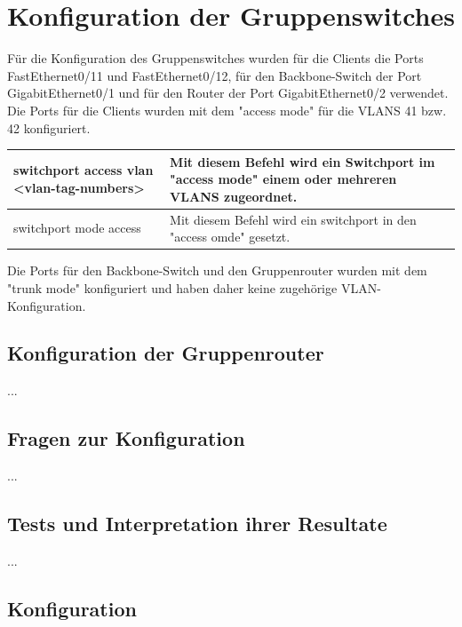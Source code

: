 \documentclass{article}
\begin{document}
\section{Konfiguration der Gruppenswitches}

Für die Konfiguration des Gruppenswitches wurden für die Clients die Ports FastEthernet0/11 und FastEthernet0/12, für den Backbone-Switch der Port GigabitEthernet0/1 und für den Router der Port GigabitEthernet0/2 verwendet.
Die Ports für die Clients wurden mit dem "access mode" für die VLANS 41 bzw. 42 konfiguriert.

\begin{tabular}{ | m{} | m{} | } 
  \hline
  switchport access vlan <vlan-tag-numbers> & Mit diesem Befehl wird ein Switchport im "access mode" einem oder mehreren VLANS zugeordnet. \\ 
  \hline
  switchport mode access & Mit diesem Befehl wird ein switchport in den "access omde" gesetzt. \\ 
  \hline
\end{tabular}
Die Ports für den Backbone-Switch und den Gruppenrouter wurden mit dem "trunk mode" konfiguriert und haben daher keine zugehörige VLAN-Konfiguration.
\subsection{Konfiguration der Gruppenrouter}

...

\subsection{Fragen zur Konfiguration}

...

\subsection{Tests und Interpretation ihrer Resultate}

...

\subsection{Konfiguration}

% 
% 
\end{document}
